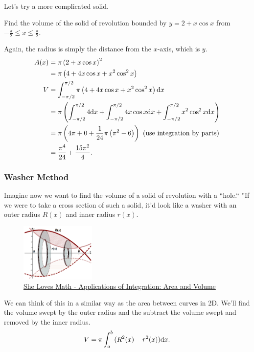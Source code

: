 Let's try a more complicated solid.
\begin{example}
	Find the volume of the solid of revolution bounded by $y=2+x\cos{x}$ from $-\frac{\pi}{2} \leq x \leq \frac{\pi}{2}$.
\end{example}
\begin{answer}
	Again, the radius is simply the distance from the $x$-axis, which is $y$.
	\begin{align*}
		A(x) &= \pi \left(2+x\cos{x}\right)^2 \\
		&= \pi \left(4 + 4x\cos{x} + x^2\cos^2{x}\right) \\
		V &= \int_{-\pi/2}^{\pi/2}{\pi \left(4 + 4x\cos{x} + x^2\cos^2{x}\right)\mathrm{d} x} \\
		&= \pi\left(\int_{-\pi/2}^{\pi/2}{4\mathrm{d} x}+\int_{-\pi/2}^{\pi/2}{4x\cos{x}\mathrm{d} x}+\int_{-\pi/2}^{\pi/2}{x^2\cos^2{x}\mathrm{d} x}\right) \\
		&= \pi\left(4\pi + 0 + \frac{1}{24}\pi\left(\pi^2-6\right)\right) \text{ (use integration by parts)}\\
		&= \frac{\pi^4}{24} + \frac{15\pi^2}{4}.
	\end{align*}
\end{answer}

\subsubsection{Washer Method}
Imagine now we want to find the volume of a solid of revolution with a ``hole.``
''If we were to take a cross section of such a solid, it'd look like a washer with an outer radius $R(x)$ and inner radius $r(x)$.

\begin{figure}[H]
	\label{washers}
	\centering
	\includegraphics[width=0.33\textwidth]{./applications_integrals/Washer-1.png}
	\caption{\hyperref{https://www.shelovesmath.com/calculus/integral-calculus/applications-integration-area-volume/}{}{}{She Loves Math - Applications of Integration: Area and Volume}}
\end{figure}


We can think of this in a similar way as the area between curves in 2D.
We'll find the volume swept by the outer radius and the subtract the volume swept and removed by the inner radius.
\begin{equation*}
	V = \pi\int_{a}^{b}{(R^2(x)-r^2(x))\mathrm{d} x}.
\end{equation*}

